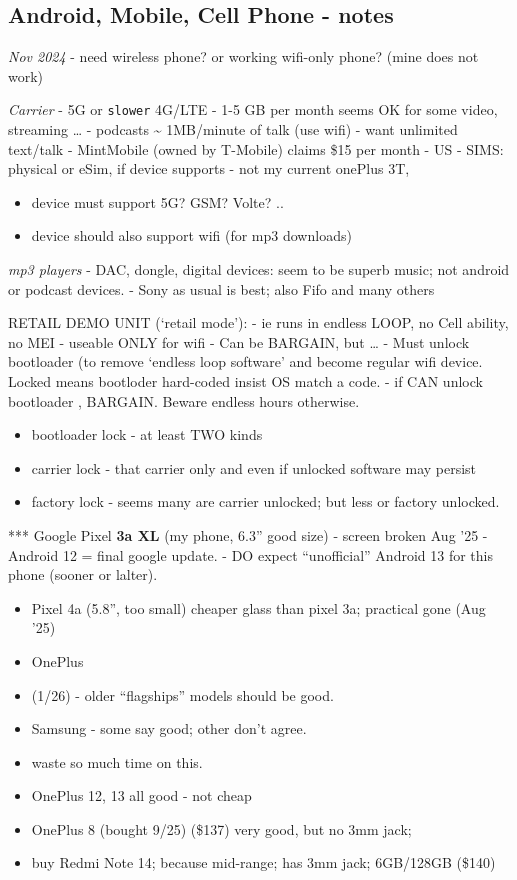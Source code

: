 \documentclass[
]{report}
\providecommand{\tightlist}{%
  \setlength{\itemsep}{0pt}\setlength{\parskip}{0pt}}\usepackage{longtable,booktabs,array}
\begin{document}
\subsection{Android, Mobile, Cell Phone -
notes}\label{android-mobile-cell-phone---notes}

\emph{Nov 2024} - need wireless phone? or working wifi-only phone? (mine
does not work)

\emph{Carrier} - 5G or \texttt{slower} 4G/LTE - 1-5 GB per month seems
OK for some video, streaming \ldots{} - podcasts \textasciitilde{}
1MB/minute of talk (use wifi) - want unlimited text/talk - MintMobile
(owned by T-Mobile) claims \$15 per month - US - SIMS: physical or eSim,
if device supports - not my current onePlus 3T,

\begin{itemize}
\tightlist
\item
  device must support 5G? GSM? Volte? ..
\item
  device should also support wifi (for mp3 downloads)
\end{itemize}

\emph{mp3 players} - DAC, dongle, digital devices: seem to be superb
music; not android or podcast devices. - Sony as usual is best; also
Fifo and many others

RETAIL DEMO UNIT (`retail mode'): - ie runs in endless LOOP, no Cell
ability, no MEI - useable ONLY for wifi - Can be BARGAIN, but \ldots{} -
Must unlock bootloader (to remove `endless loop software' and become
regular wifi device. Locked means bootloder hard-coded insist OS match a
code. - if CAN unlock bootloader , BARGAIN. Beware endless hours
otherwise.

\begin{itemize}
\tightlist
\item
  bootloader lock - at least TWO kinds
\item
  carrier lock - that carrier only and even if unlocked software may
  persist
\item
  factory lock - seems many are carrier unlocked; but less or factory
  unlocked.
\end{itemize}

*** Google Pixel \textbf{3a XL} (my phone, 6.3'' good size) - screen
broken Aug '25 - Android 12 = final google update. - DO expect
``unofficial'' Android 13 for this phone (sooner or lalter).

\begin{itemize}
\item
  Pixel 4a (5.8'', too small) cheaper glass than pixel 3a; practical
  gone (Aug '25)
\item
  OnePlus
\item
  (1/26) - older ``flagships'' models should be good.
\item
  Samsung - some say good; other don't agree.
\item
  waste so much time on this.
\item
  OnePlus 12, 13 all good - not cheap
\item
  OnePlus 8 (bought 9/25) (\$137) very good, but no 3mm jack;
\item
  buy Redmi Note 14; because mid-range; has 3mm jack; 6GB/128GB (\$140)
\end{itemize}
\end{document}
